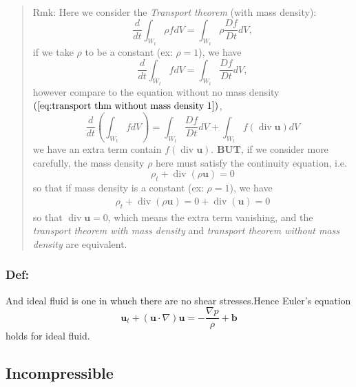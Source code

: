 \begin{quote}
	Rmk:
Here we consider the \textit{Transport theorem} (with mass density):
\begin{equation}
\frac{d}{dt}\int_{W_t} \rho f dV = \int_{W_t} \rho \frac{Df}{Dt} dV,
\end{equation}
if we take $\rho$ to be a constant (ex: $\rho =1$), we have
\begin{equation}
\frac{d}{dt}\int_{W_t} f dV = \int_{W_t} \frac{Df}{Dt} dV,
\end{equation}
however compare to the equation without no mass density  $(\ref{eq:transport thm without mass density 1})$​,
\begin{equation}
\frac{d}{dt}\left(\int_{W_t} fdV\right)
= \int_{W_t} \frac{Df}{Dt}dV + \int_{W_t}f(\operatorname{div}\textbf{u}) dV
\end{equation}
we have an extra term contain $f(\operatorname{div}\textbf{u})$. \textbf{BUT}, if  we consider more carefully, the mass density $\rho$ here must satisfy the continuity equation, i.e.
\begin{equation}
\rho_t + \operatorname{div}(\rho \textbf{u}) = 0
\end{equation}
so that if mass density is a constant (ex: $\rho = 1 $), we have
\begin{equation}
\begin{aligned}
\rho_t + \operatorname{div}(\rho \textbf{u}) = 0 + \operatorname{div}(\textbf{u}) = 0
\end{aligned}
\end{equation}
so that $\operatorname{div}\textbf{u} = 0$, which means the extra term vanishing, and the \textit{transport theorem with mass density} and \textit{transport theorem without mass density} are equivalent.
\end{quote}

\subsubsection{Def:} %

And ideal fluid is one in whuch there are no shear stresses.Hence Euler's equation 
\begin{equation}
\textbf{u}_t  + (\textbf{u}\cdot \nabla)\textbf{u} = -\frac{\nabla p}{\rho} + \textbf{b}
\end{equation}
holds for ideal fluid.

\subsection{Incompressible} %


